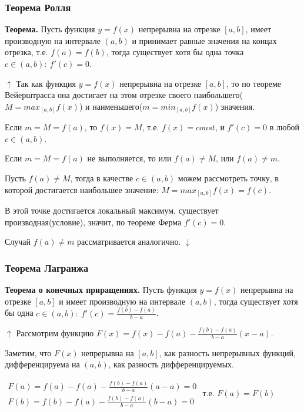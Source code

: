 \documentclass{article}
\begin{document}
\subsubsection{Теорема Ролля}

\textbf{Теорема.} Пусть функция \(y = f(x)\) непрерывна на отрезке \([a, b]\), имеет производную на интервале \((a, b)\) и принимает равные значения на концах отрезка, т.е. \(f(a) = f(b)\), тогда существует хотя бы одна точка \(c \in (a, b):\ f'(c) = 0\).

\(\uparrow\) Так как функция \(y = f(x)\) непрерывна на отрезке \([a, b]\), то по теореме Вейерштрасса она достигает на этом отрезке своего наибольшего(\(M = {max}_{[a, b]}f(x)\)) и наименьшего(\(m = {min}_{[a, b]}f(x)\)) значения.

Если \(m = M = f(a)\), то \(f(x) = M\), т.е. \(f(x) = const\), и \(f'(c) = 0\) в любой \(c \in (a, b)\).

Если \(m = M = f(a)\) не выполняется, то или \(f(a) \neq M\), или \(f(a) \neq m\).

Пусть \(f(a) \neq M\), тогда в качестве \(c \in (a, b)\) можем рассмотреть точку, в которой достигается наибольшее значение: \(M = {max}_{[a, b]} f(x) = f(c)\).

В этой точке достигается локальный максимум, существует производная(условие), значит, по теореме Ферма \(f'(c) = 0\).

Случай \(f(a) \neq m\) рассматривается аналогично. \(\downarrow\)

\subsubsection{Теорема Лагранжа}

\textbf{Теорема о конечных приращениях.} Пусть функция \(y = f(x)\) непрерывна на отрезке \([a, b]\) и имеет производную на интервале \((a, b)\), тогда существует хотя бы одна \(c \in (a, b):\ f'(c) = \frac{f(b)-f(a)}{b-a}\).

\(\uparrow\) Рассмотрим функцию \(F(x) = f(x) - f(a) - \frac{f(b) - f(a)}{b - a}(x-a)\).

Заметим, что \(F(x)\) непрерывна на \([a, b]\), как разность непрерывных функций, дифференцируема на \((a, b)\), как разность дифференцируемых.

\(\begin{array}{l}
    F(a) = f(a) - f(a) - \frac{f(b)-f(a)}{b-a}(a-a) = 0\\
    F(b) = f(b) - f(a) - \frac{f(b)-f(a)}{b-a}(b-a) = 0
\end{array}\)
т.е. \(F(a) = F(b)\)
\end{document}
